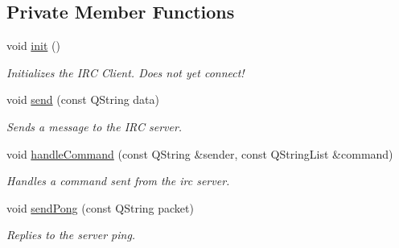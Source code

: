 \subsection*{Private Member Functions}
\begin{DoxyCompactItemize}
\item 
void \hyperlink{classserver_1_1irc_client_a3991833ddcff72ca94d4c0ec588012ac}{init} ()
\begin{DoxyCompactList}\small\item\em Initializes the I\-R\-C Client. Does not yet connect! \end{DoxyCompactList}\item 
void \hyperlink{classserver_1_1irc_client_a2c1954be24f18aef7d8ec6a7a3e7f29c}{send} (const Q\-String data)
\begin{DoxyCompactList}\small\item\em Sends a message to the I\-R\-C server. \end{DoxyCompactList}\item 
void \hyperlink{classserver_1_1irc_client_af618e7f589a052d90e2dadbc87e83429}{handle\-Command} (const Q\-String \&sender, const Q\-String\-List \&command)
\begin{DoxyCompactList}\small\item\em Handles a command sent from the irc server. \end{DoxyCompactList}\item 
void \hyperlink{classserver_1_1irc_client_a478f7914fdcea7103fe8166d55e76df1}{send\-Pong} (const Q\-String packet)
\begin{DoxyCompactList}\small\item\em Replies to the server ping. \end{DoxyCompactList}\end{DoxyCompactItemize}
